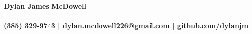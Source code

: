\documentclass[letterpaper]{deedy-resume}
\begin{document}
\begin{flushleft}
  {\Huge \textbf{Dylan James McDowell}\\}
  \vspace{-3.5mm}
  {\large\textbf{\\ (385) 329-9743 | dylan.mcdowell226@gmail.com | github.com/dylanjm }}
\end{flushleft}


\vspace{-3mm}
\hspace{-6.5mm}
\end{document}
